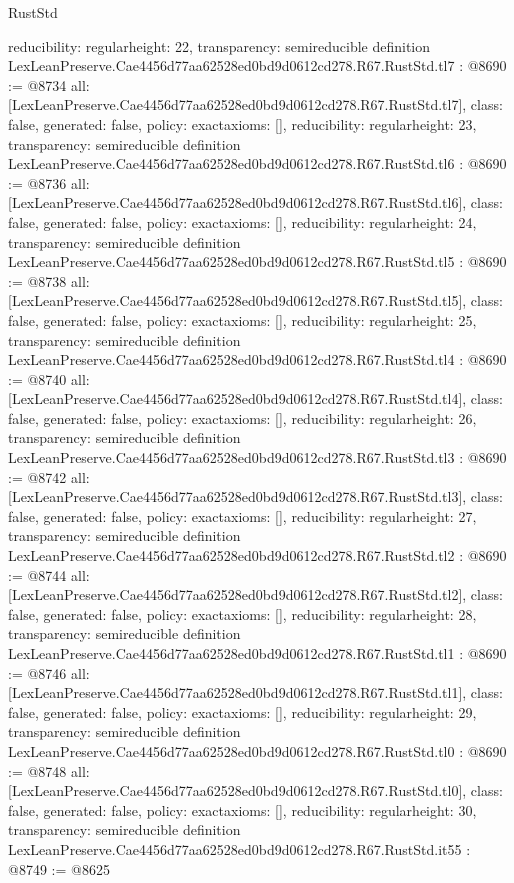 \begin{lexlean}{RustStd}
\begin{coremodule}
{  reducibility: regular{height: 22},
  transparency: semireducible
}
definition LexLeanPreserve.Cae4456d77aa62528ed0bd9d0612cd278.R67.RustStd.tl7 : @8690 := @8734 {
  all: [LexLeanPreserve.Cae4456d77aa62528ed0bd9d0612cd278.R67.RustStd.tl7],
  class: false,
  generated: false,
  policy: exact{axioms: []},
  reducibility: regular{height: 23},
  transparency: semireducible
}
definition LexLeanPreserve.Cae4456d77aa62528ed0bd9d0612cd278.R67.RustStd.tl6 : @8690 := @8736 {
  all: [LexLeanPreserve.Cae4456d77aa62528ed0bd9d0612cd278.R67.RustStd.tl6],
  class: false,
  generated: false,
  policy: exact{axioms: []},
  reducibility: regular{height: 24},
  transparency: semireducible
}
definition LexLeanPreserve.Cae4456d77aa62528ed0bd9d0612cd278.R67.RustStd.tl5 : @8690 := @8738 {
  all: [LexLeanPreserve.Cae4456d77aa62528ed0bd9d0612cd278.R67.RustStd.tl5],
  class: false,
  generated: false,
  policy: exact{axioms: []},
  reducibility: regular{height: 25},
  transparency: semireducible
}
definition LexLeanPreserve.Cae4456d77aa62528ed0bd9d0612cd278.R67.RustStd.tl4 : @8690 := @8740 {
  all: [LexLeanPreserve.Cae4456d77aa62528ed0bd9d0612cd278.R67.RustStd.tl4],
  class: false,
  generated: false,
  policy: exact{axioms: []},
  reducibility: regular{height: 26},
  transparency: semireducible
}
definition LexLeanPreserve.Cae4456d77aa62528ed0bd9d0612cd278.R67.RustStd.tl3 : @8690 := @8742 {
  all: [LexLeanPreserve.Cae4456d77aa62528ed0bd9d0612cd278.R67.RustStd.tl3],
  class: false,
  generated: false,
  policy: exact{axioms: []},
  reducibility: regular{height: 27},
  transparency: semireducible
}
definition LexLeanPreserve.Cae4456d77aa62528ed0bd9d0612cd278.R67.RustStd.tl2 : @8690 := @8744 {
  all: [LexLeanPreserve.Cae4456d77aa62528ed0bd9d0612cd278.R67.RustStd.tl2],
  class: false,
  generated: false,
  policy: exact{axioms: []},
  reducibility: regular{height: 28},
  transparency: semireducible
}
definition LexLeanPreserve.Cae4456d77aa62528ed0bd9d0612cd278.R67.RustStd.tl1 : @8690 := @8746 {
  all: [LexLeanPreserve.Cae4456d77aa62528ed0bd9d0612cd278.R67.RustStd.tl1],
  class: false,
  generated: false,
  policy: exact{axioms: []},
  reducibility: regular{height: 29},
  transparency: semireducible
}
definition LexLeanPreserve.Cae4456d77aa62528ed0bd9d0612cd278.R67.RustStd.tl0 : @8690 := @8748 {
  all: [LexLeanPreserve.Cae4456d77aa62528ed0bd9d0612cd278.R67.RustStd.tl0],
  class: false,
  generated: false,
  policy: exact{axioms: []},
  reducibility: regular{height: 30},
  transparency: semireducible
}
definition LexLeanPreserve.Cae4456d77aa62528ed0bd9d0612cd278.R67.RustStd.it55 : @8749 := @8625 {
}
\end{coremodule}
\end{lexlean}
